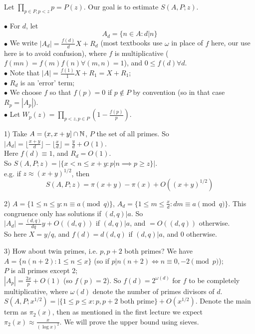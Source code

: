 \documentclass[a4paper]{article}
\begin{document}
Let $\prod_{p \in P, p < z} p = P(z)$. Our goal is to estimate $S(A,P;z)$.

$\bullet$ For $d$, let
\[
A_d = \{n \in A:d | n\}
\]
$\bullet$ We write $|A_d| = \frac{f(d)}{d} X + R_d$ (most textbooks use $\omega$ in place of $f$ here, our use here is to avoid confusion), where $f$ is multiplicative ($f(mn) = f(m) f(n) \forall (m,n)=1$), and $0 \leq f(d) \forall d$.\\
$\bullet$ Note that $|A| = \frac{f(1)}{1} X + R_1 = X+R_1$;\\
$\bullet$ $R_d$ is an 'error' term;\\
$\bullet$ We choose $f$ so that $f(p) = 0$ if $p \not\in P$ by convention (so in that case $R_p = |A_p|$).\\
$\bullet$ Let $W_p(z) = \prod_{p < z, p \in P} (1-\frac{f(p)}{p})$.

\begin{eg}
1) Take $A=(x,x+y] \cap \mathbb{N}$, $P$ the set of all primes. So $|A_d| = \lfloor \frac{x+y}{d} \rfloor - \lfloor \frac{x}{d}\rfloor = \frac{y}{d} + O(1)$.\\
Here $f(d) \equiv 1$, and $R_d = O(1)$.\\
So $S(A,P;z)= |\{x < n \leq x+y: p | n \implies p \geq z\}|$.\\
e.g. if $z \approx (x+y)^{1/2}$, then
\[
S(A,P;z) = \pi(x+y)-\pi(x) + O((x+y)^{1/2})
\]
\end{eg}

2) $A = \{1 \leq n \leq y: n \equiv a \pmod q\}$, $A_d = \{1 \leq m \leq \frac{x}{d}: dm \equiv a \pmod q\}$. This congruence only has solutions if $(d,q) | a$. So \\
$|A_d| = \frac{(d,q)}{dq} y + O((d,q))$ if $(d,q) | a$, and $=O((d,q))$ otherwise.\\
So here $X=y/q$, and $f(d) = d(d,q)$ if $(d,q) | a$, and $0$ otherwise.

3) How about twin primes, i.e. $p,p+2$ both primes? We have\\
$A=\{n(n+2): 1 \leq n \leq x\}$ (so if $p|n(n+2) \iff n \equiv 0,-2 \pmod p$);\\
$P$ is all primes except 2;\\
$|A_p| = \frac{2x}{p} + O(1)$ (so $f(p) = 2$). So $f(d) = 2^{\omega(d)}$ for $f$ to be completely multiplicative, where $\omega(d)$ denote the number of primes divisors of $d$.\\
$S(A,P;x^{1/2}) = |\{1 \leq p \leq x: p,p+2$ both prime$\} + O(x^{1/2})$. Denote the main term as $\pi_2(x)$, then as mentioned in the first lecture we expect $\pi_2(x) \approx \frac{x}{(\log x)^2}$. We will prove the upper bound using sieves.
\end{document}
